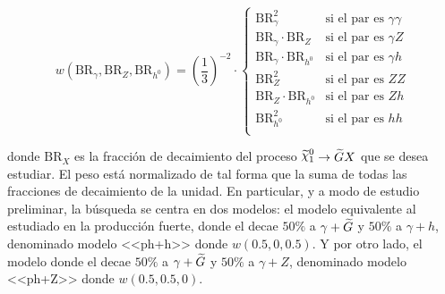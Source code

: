 

\begin{equation}
  w(\text{BR}_{\gamma}, \text{BR}_{Z}, \text{BR}_{h^{0}})=\left(\frac{1}{3}\right)^{-2}\cdot\begin{cases}
    \text{BR}_{\gamma}^{2} & \text{si el par es } \gamma\gamma \\
    \text{BR}_{\gamma}\cdot\text{BR}_{Z} & \text{si el par es } \gamma Z \\
    \text{BR}_{\gamma}\cdot\text{BR}_{h^{0}} & \text{si el par es } \gamma h \\
    \text{BR}_{Z}^{2} & \text{si el par es } ZZ \\
    \text{BR}_{Z}\cdot\text{BR}_{h^{0}} & \text{si el par es } Zh \\
    \text{BR}_{h^{0}}^{2} & \text{si el par es } hh \\
  \end{cases}
\end{equation}

\noindent
donde $\text{BR}_{X}$ es la fracción de decaimiento del proceso $\ninoone \to \gravino X$ que se desea estudiar.
El peso está normalizado de tal forma que la suma de todas las fracciones de decaimiento de la unidad. En particular, y a modo de estudio preliminar, la búsqueda se centra en dos modelos: el modelo equivalente al estudiado en la producción fuerte, donde el \ninoone decae $50\%$ a $\gamma + \widetilde{G}$ y $50\%$ a $\gamma + h$, denominado modelo <<ph+h>> donde $w(0.5, 0, 0.5)$. Y por otro lado, el modelo donde el \ninoone decae $50\%$ a $\gamma + \widetilde{G}$ y $50\%$ a $\gamma + Z$, denominado modelo <<ph+Z>> donde $w(0.5, 0.5, 0)$.


